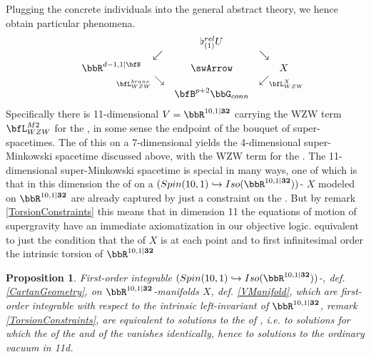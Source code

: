 \documentclass[12pt,titlepage]{article}
\def\mathllap{\mathpalette\mathllapinternal}
\def\mathrlap{\mathpalette\mathrlapinternal}
\def\mathllapinternal#1#2{\llap{$\mathsurround=0pt#1{#2}$}}
\def\mathrlapinternal#1#2{\rlap{$\mathsurround=0pt#1{#2}$}}
\newcommand{\itexarray}[1]{\begin{matrix}#1\end{matrix}}
\theoremstyle{plain}
\newtheorem{prop}{Proposition}
\theoremstyle{definition}
\theoremstyle{remark}
\begin{document}
Plugging the concrete individuals into the general abstract theory, we hence obtain particular phenomena.
\begin{displaymath}
\itexarray{
&& \flat^{rel}_{(1)} U
\\
& \swarrow && \searrow
\\
\bbR^{d-1,1|\bfN}
&& \swArrow &&
X
\\
& {}_{\mathllap{\bfL_{WZW}^{brane}}}\searrow && \swarrow_{\mathrlap{\bfL_{WZW}^X}}
\\
&& \bfB^{p+2}\bbG_{conn}
}
\end{displaymath}
Specifically there is 11-dimensional  $V = \bbR^{10,1\vert \mathbf{32}}$ carrying the WZW term $\bfL_{WZW}^{M2}$ for the , in some sense the endpoint of the bouquet of super-spacetimes. The  of this on a 7-dimensional  yields the 4-dimensional super-Minkowski spacetime discussed above, with the WZW term for the .
The 11-dimensional super-Minkowski spacetime is special in many ways, one of which is that in this dimension the  of  on a $(Spin(10,1)\hookrightarrow Iso(\bbR^{10,1\vert \mathbf{32}}))$- $X$ modeled on $\bbR^{10,1\vert \mathbf{32}}$ are already captured by just a constraint on the . But by remark \ref{TorsionConstraints} this means that in dimension 11 the equations of motion of supergravity have an immediate axiomatization in our objective logic.
equivalent to just the condition that the of $X$ is at each point and to first infinitesimal order the intrinsic torsion of $\bbR^{10,1\vert \mathbf{32}}$
\begin{prop}
\label{VacuumSolutionsIn11d}\hypertarget{VacuumSolutionsIn11d}{}
First-order integrable $(Spin(10,1)\hookrightarrow Iso(\bbR^{10,1\vert \mathbf{32}}))$-, def. \ref{CartanGeometry}, on $\bbR^{10,1\vert\mathbf{32}}$-manifolds $X$, def. \ref{VManifold}, which are first-order integrable with respect to the intrinsic left-invariant  of $\bbR^{10,1\vert \mathbf{32}}$, remark \ref{TorsionConstraints}, are equivalent to  solutions to the  of , i.e. to solutions for which the  of the  and of the  vanishes identically, hence to solutions to the ordinary vacuum  in 11d.
\end{prop}
\end{document}
